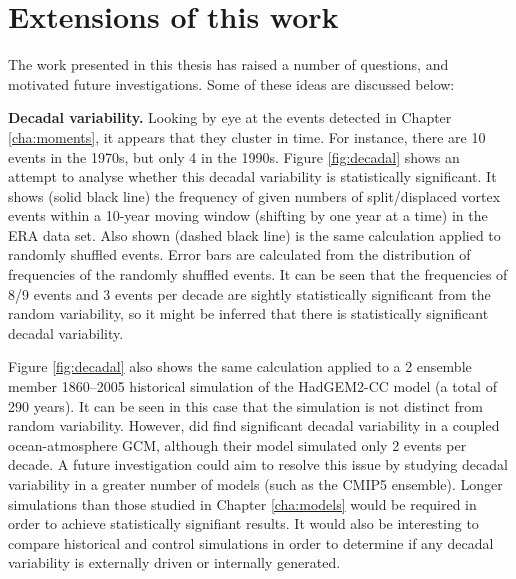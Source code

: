
\section{Extensions of this work}

The work presented in this thesis has raised a number of questions, and
motivated future investigations. Some of these ideas are discussed below:

\bigskip\noindent\textbf{Decadal variability.} Looking by eye at the events
detected in Chapter \ref{cha:moments}, it appears that they cluster in time. For
instance, there are 10 events in the 1970s, but only 4 in the 1990s. Figure
\ref{fig:decadal} shows an attempt to analyse whether this decadal variability
is statistically significant. It shows (solid black line) the frequency of given
numbers of split/displaced vortex events within a 10-year moving window
(shifting by one year at a time) in the ERA data set. Also shown (dashed black
line) is the same calculation applied to randomly shuffled events. Error bars
are calculated from the distribution of frequencies of the randomly shuffled
events. It can be seen that the frequencies of 8/9 events and 3 events per
decade are sightly statistically significant from the random
variability, so it might be inferred that there is statistically significant
decadal variability. 

Figure \ref{fig:decadal} also shows the same calculation applied to a 2 ensemble
member 1860--2005 historical simulation of the HadGEM2-CC model (a total of 290
years). It can be seen in this case that the simulation is not distinct from
random variability. However, \citet{Schimanke2011} did find significant decadal
variability in a coupled ocean-atmosphere GCM, although their model simulated
only 2 events per decade. A future investigation could aim to resolve this issue
by studying decadal variability in a greater number of models (such as the CMIP5
ensemble). Longer simulations than those studied in Chapter \ref{cha:models}
would be required in order to achieve statistically signifiant results. It would
also be interesting to compare historical and control simulations in order to
determine if any decadal variability is externally driven or internally
generated.

